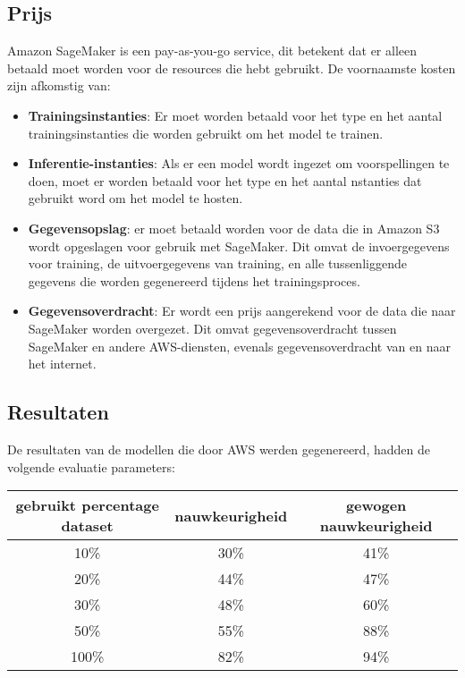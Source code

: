 \subsection{Prijs}
Amazon SageMaker is een pay-as-you-go service, dit betekent dat er alleen betaald moet worden voor de resources die hebt gebruikt. De voornaamste kosten zijn afkomstig van:
\begin{itemize}
    \item \textbf{Trainingsinstanties}: Er moet worden betaald voor het type en het aantal trainingsinstanties die worden gebruikt om het model te trainen.
    
    \item \textbf{ Inferentie-instanties}: Als er een model wordt ingezet om voorspellingen te doen, moet er worden betaald voor het type en het aantal nstanties dat gebruikt word om het model te hosten.
    
    \item \textbf{Gegevensopslag}: er moet betaald worden voor de data die in Amazon S3 wordt opgeslagen voor gebruik met SageMaker. Dit omvat de invoergegevens voor training, de uitvoergegevens van training, en alle tussenliggende gegevens die worden gegenereerd tijdens het trainingsproces.
    
    \item\textbf{ Gegevensoverdracht}: Er wordt een prijs aangerekend voor de data die naar SageMaker worden overgezet. Dit omvat gegevensoverdracht tussen SageMaker en andere AWS-diensten, evenals gegevensoverdracht van en naar het internet.
\end{itemize}


\subsection{Resultaten}
De resultaten van de modellen die door AWS werden gegenereerd, hadden de volgende evaluatie parameters:
\begin{center}
    \begin{tabular} {|c | c | c |}
        \hline
        gebruikt percentage dataset & nauwkeurigheid & gewogen nauwkeurigheid \\
        \hline
        10\% & 30\% & 41\% \\
        \hline
        20\% & 44\% & 47\% \\
        \hline
         30\% & 48\% & 60\% \\
        \hline
         50\% & 55\% & 88\% \\
        \hline
         100\% & 82\% & 94\% \\
        \hline
    \end{tabular}
\end{center}


